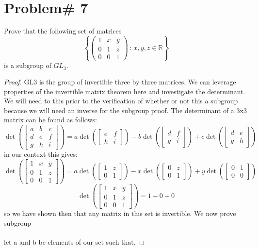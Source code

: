 \documentclass[11pt]{article}
\theoremstyle{definition}  %
\newcommand{\R}{\mathbb{R}}
\begin{document}
\section* {Problem# 7}Prove that the following set of matrices
  $$ \left\{ \left( \begin{array}{ccc} 1 & x & y \\ 0 & 1 & z  \\ 0 & 0 & 1 \end{array} \right) \, : \,  x, y, z \in \R \right\} $$
  is a subgroup of $GL_3$.
  \begin{proof}
    GL3 is the group of invertible three by three matrices. We can leverage properties of the invertible matrix theorem here and investigate the determinant. We will need to this prior to the verification of whether or not this a subgroup because we will need an inverse for the subgroup proof. The determinant of a 3x3 matrix can be found as follows:
    \[
      \det\left(\begin{bmatrix}
        a&b&c\\d&e&f\\g&h&i
    \end{bmatrix}\right)=a\det\left(\begin{bmatrix}
      e&f\\h&i
    \end{bmatrix}\right)-b\det\left(\begin{bmatrix}
      d&f\\g&i
    \end{bmatrix}\right)+
    c\det\left(\begin{bmatrix}
      d&e\\g&h
    \end{bmatrix}\right)
    \]
    in our context this gives:
    \[
      \det\left(\begin{bmatrix}
      1 & x & y \\ 0 & 1 & z  \\ 0 & 0 & 1
    \end{bmatrix}\right)=a\det\left(\begin{bmatrix}
      1&z\\0&1
    \end{bmatrix}\right)-x\det\left(\begin{bmatrix}
      0&z\\0&1
    \end{bmatrix}\right)+
    y\det\left(\begin{bmatrix}
      0&1\\0&0
    \end{bmatrix}\right)
    \]
    \[
    \det\left(\begin{bmatrix}
    1 & x & y \\ 0 & 1 & z  \\ 0 & 0 & 1
  \end{bmatrix}\right)=1-0+0
    \]
    so we have shown then that any matrix in this set is invertible. We now prove subgroup\\\\
    let a and b be elements of our set such that.


\end{proof}
\end{document}
